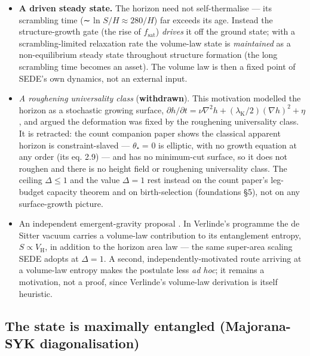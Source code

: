 \documentclass[11pt,a4paper]{article}
\providecommand{\tightlist}{\setlength{\itemsep}{0pt}\setlength{\parskip}{0pt}}
\begin{document}
\begin{itemize}
\tightlist
\item
  \textbf{A driven steady state.} The horizon need not self-thermalise
  --- its scrambling time (∼ ln \(S / H \approx  280/H\)) far exceeds
  its age. Instead the structure-growth gate (the rise of
  \(f_{\mathrm{sat}}\)) \emph{drives} it off the ground state; with a
  scrambling-limited relaxation rate the volume-law state is
  \emph{maintained} as a non-equilibrium steady state throughout
  structure formation (the long scrambling time becomes an asset). The
  volume law is then a fixed point of SEDE's own dynamics, not an
  external input.
\item
  \emph{A roughening universality class} (\textbf{withdrawn}). This
  motivation modelled the horizon as a stochastic growing surface,
  \(\partial h/\partial t = \nu \nabla ^{2}h + (\lambda _{\mathrm{K}}/2)(\nabla h)^{2} + \eta\),
  and argued the deformation was fixed by the roughening universality
  class. It is retracted: the count companion paper
  \citep{Pandev:2026count} shows the classical apparent horizon is
  constraint-slaved --- \(\theta\)₊ = 0 is elliptic, with no growth
  equation at any order (its eq. 2.9) --- and has no minimum-cut
  surface, so it does not roughen and there is no height field or
  roughening universality class. The ceiling \(\Delta  \leq  1\) and the
  value \(\Delta  = 1\) rest instead on the count paper's leg-budget
  capacity theorem and on birth-selection (foundations §5), not on any
  surface-growth picture.
\item
  An independent emergent-gravity proposal \citep{Verlinde:2016toy}. In
  Verlinde's programme the de Sitter vacuum carries a volume-law
  contribution to its entanglement entropy,
  \(S \propto  V_{\mathrm{H}}\), in addition to the horizon area law ---
  the same super-area scaling SEDE adopts at \(\Delta  = 1\). A second,
  independently-motivated route arriving at a volume-law entropy makes
  the postulate less \emph{ad hoc}; it remains a motivation, not a
  proof, since Verlinde's volume-law derivation is itself heuristic.
\end{itemize}

\subsection{The state is maximally entangled (Majorana-SYK
diagonalisation)}\label{sec-1-2}
\end{document}
